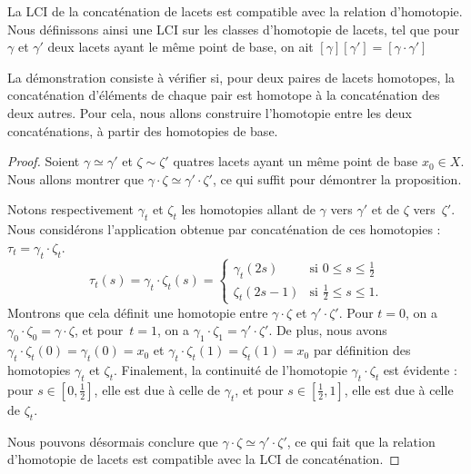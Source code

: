 \begin{proposition}
La LCI de la concaténation de lacets est compatible avec la relation d'homotopie. Nous définissons ainsi une LCI sur les classes d'homotopie de lacets, tel que pour $\gamma$ et $\gamma'$ deux lacets ayant le même point de base, on ait $[\gamma][\gamma']=[\gamma\cdot\gamma']$
\end{proposition}

La démonstration consiste à vérifier si, pour deux paires de lacets homotopes, la concaténation d'éléments de chaque pair est homotope à la concaténation des deux autres. Pour cela, nous allons construire l'homotopie entre les deux concaténations, à partir des homotopies de base.

\begin{proof}
Soient $\gamma\simeq\gamma'$ et $\zeta\sim\zeta'$ quatres lacets ayant un même point de base $x_0\in X$. Nous allons montrer que $\gamma\cdot\zeta\simeq\gamma'\cdot\zeta'$, ce qui suffit pour démontrer la proposition.

Notons respectivement $\gamma_t$ et $\zeta_t$ les homotopies allant de $\gamma$ vers $\gamma'$ et de $\zeta$ vers~$\zeta'$. Nous considérons l'application obtenue par concaténation de ces homotopies :$\tau_t=\gamma_t\cdot \zeta_t$. \begin{equation}\label{eq:homotopy-concatenate}
\tau_t(s)=\gamma_t\cdot\zeta_t(s)=\left\{\begin{matrix}
\gamma_t(2s)&\text{si }0\leq s\leq \frac{1}{2}\\ 
\zeta_t(2s-1)&\text{si }\frac{1}{2}\leq s\leq 1.
\end{matrix}\right.
\end{equation}Montrons que cela définit une homotopie entre $\gamma\cdot\zeta$ et $\gamma'\cdot\zeta'$. Pour $t=0$, on a $\gamma_0\cdot\zeta_0=\gamma\cdot\zeta$, et pour~$t=1$, on a $\gamma_1\cdot\zeta_1=\gamma'\cdot\zeta'$. De plus, nous avons $\gamma_t\cdot\zeta_t(0)=\gamma_t(0)=x_0$ et $\gamma_t\cdot\zeta_t(1)=\zeta_t(1)=x_0$ par définition des homotopies $\gamma_t$ et $\zeta_t$. Finalement, la continuité de l'homotopie $\gamma_t\cdot\zeta_t$ est évidente : pour $s\in[0,\frac{1}{2}]$, elle est due à celle de $\gamma_t$, et pour $s\in[\frac{1}{2},1]$, elle est due à celle de $\zeta_t$.

Nous pouvons désormais conclure que $\gamma\cdot\zeta\simeq\gamma'\cdot\zeta'$, ce qui fait que la relation d'homotopie de lacets est compatible avec la LCI de concaténation.
\end{proof}

